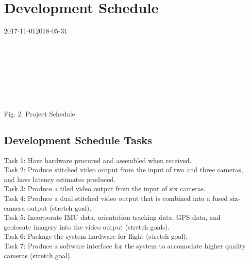 \documentclass[letterpaper,10pt,serif,draftclsnofoot,onecolumn,compsoc,titlepage]{IEEEtran}
\begin{document}
\section{Development Schedule}
	\begin{ganttchart}
    	[hgrid, x unit=0.77mm, y unit chart=9.0mm, title label font=\normalsize, time slot format=isodate]
    	{2017-11-01}{2018-05-31}
    	\\
    	\\
    	\\
    	\\
    	\\
    	\\
    	\\
    	\\
	\end{ganttchart}
\begin{center}
	Fig. 2: Project Schedule
\end{center}	

\subsection{Development Schedule Tasks}
Task 1: Have hardware procured and assembled when received.\\
Task 2: Produce stitched video output from the input of two and three cameras, 
and have latency estimates produced.\\
Task 3: Produce a tiled video output from the input of six cameras.\\
Task 4: Produce a dual stitched video output that is combined into a fused 
six-camera output (stretch goal).\\
Task 5: Incorporate IMU data, orientation tracking data, GPS data, and 
geolocate imagery into the video output (stretch goals).\\
Task 6: Package the system hardware for flight (stretch goal).\\
Task 7: Produce a software interface for the system to accomodate higher 
quality cameras (stretch goal).\\
\end{document}
